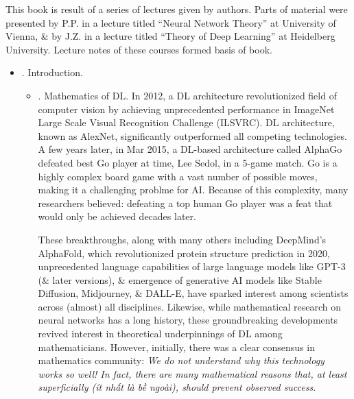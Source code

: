 \documentclass{article}
\begin{document}
This book is result of a series of lectures given by authors. Parts of material were presented by P.P. in a lecture titled ``Neural Network Theory'' at University of Vienna, \& by J.Z. in a lecture titled ``Theory of Deep Learning'' at Heidelberg University. Lecture notes of these courses formed basis of book. 
\begin{itemize}
	\item {. Introduction.}
	\begin{itemize}
		\item {. Mathematics of DL.} In 2012, a DL architecture revolutionized field of computer vision by achieving unprecedented performance in ImageNet Large Scale Visual Recognition Challenge (ILSVRC). DL architecture, known as AlexNet, significantly outperformed all competing technologies. A few years later, in Mar 2015, a DL-based architecture called AlphaGo defeated best Go player at time, {\sc Lee Sedol}, in a 5-game match. Go is a highly complex board game with a vast number of possible moves, making it a challenging problme for AI. Because of this complexity, many researchers believed: defeating a top human Go player was a feat that would only be achieved decades later.
		
		These breakthroughs, along with many others including DeepMind's AlphaFold, which revolutionized protein structure prediction in 2020, unprecedented language capabilities of large language models like GPT-3 (\& later versions), \& emergence of generative AI models like Stable Diffusion, Midjourney, \& DALL-E, have sparked interest among scientists across (almost) all disciplines. Likewise, while mathematical research on neural networks has a long history, these groundbreaking developments revived interest in theoretical underpinnings of DL among mathematicians. However, initially, there was a clear consensus in mathematics community: {\it We do not understand why this technology works so well! In fact, there are many mathematical reasons that, at least superficially (ít nhất là bề ngoài), should prevent observed success}.
		

\end{itemize}
\end{itemize}
\end{document}

